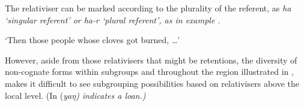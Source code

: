 The  relativiser can be marked according to the plurality
of the referent, as \it{ha} ‘singular referent’ or \it{ha-r} ‘plural referent’,
as in example .

\begin{exe}
			\glt	‘Then those people whose cloves got burned, {\ldots}’ 
						\label{ex:13-25}
\end{exe}

However, aside from those relativisers that might be retentions,
the diversity of non-cognate forms within subgroups
and throughout the region illustrated in ,
makes it difficult to see subgrouping possibilities based on
relativisers above the local level.
(In  (\it{yaŋ}) indicates a  loan.)

